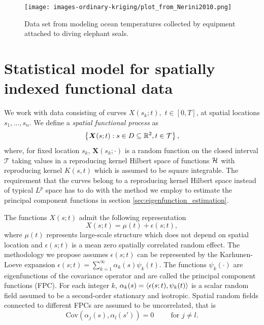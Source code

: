 \begin{figure}
	\begin{center}
		\texttt{[image: images-ordinary-kriging/plot\_from\_Nerini2010.png]}
	\end{center}
	\caption{Data set from \cite{Nerini:2010ba} modeling ocean temperatures collected by equipment attached to diving elephant seals.} \label{fig:nerini}
\end{figure}


\section{Statistical model for spatially indexed functional data} 

\label{sec:statistical_model_for_spatially_indexed_functional_data}

We work with data consisting of curves $X(s_k; t),$ $t \in [0,T]$, at spatial locations $s_1, \dots, s_n$. We define a \emph{spatial functional process} as
\[ \left\{ \boldsymbol X(s; t): s \in D \subseteq  \mathbb{R} ^2, t \in \mathcal{T} \right\}, \]
where, for fixed location $s_k$, $\boldsymbol X(s_k; \cdot)$ is a random function on the closed interval $\mathcal{T}$ taking values in a reproducing kernel Hilbert space of functions $\mathcal{H}$ with reproducing kernel $K(s,t)$ which is assumed to be square integrable. The requirement that the curves belong to a reproducing kernel Hilbert space instead of typical $L^p$ space has to do with the method we employ to estimate the principal component functions in section \ref{sec:eigenfunction_estimation}.

The functions $X(s;t)$ admit the following representation 
\begin{equation}
	X(s;t) = \mu(t) + \epsilon(s;t), 
\end{equation}
where $\mu(t)$ represents large-scale structure which does not depend on spatial location and $\epsilon(s;t)$ is a mean zero spatially correlated random effect. The methodology we propose assumes $\epsilon(s;t)$ can be represented by the Karhunen-Loeve expansion $\epsilon(s;t) = \sum_{k=1}^{\infty} \alpha_k(s)\psi_k(t)$. The functions $\psi_k(\cdot)$ are eigenfunctions of the covariance operator and are called the principal component functions (FPC). For each integer $k$, $\alpha_k(s) = \langle \epsilon(s;t),  \psi_k(t) \rangle$ is a scalar random field assumed to be a second-order stationary and isotropic. Spatial random fields connected to different FPCs are assumed to be uncorrelated, that is 
\begin{equation}
	\text{Cov}(\alpha_j(s), \alpha_l(s')) = 0 \hspace{1cm} \text{for } j \neq l. \label{eq:nocrosscor} 
\end{equation}

